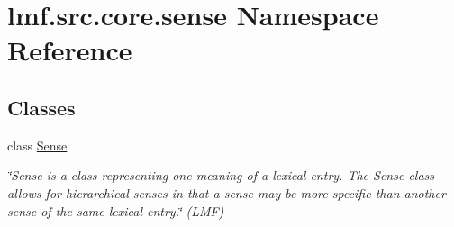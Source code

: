 \hypertarget{namespacelmf_1_1src_1_1core_1_1sense}{\section{lmf.\+src.\+core.\+sense Namespace Reference}
\label{namespacelmf_1_1src_1_1core_1_1sense}
}
\subsection*{Classes}
\begin{DoxyCompactItemize}
\item 
class \hyperlink{classlmf_1_1src_1_1core_1_1sense_1_1_sense}{Sense}
\begin{DoxyCompactList}\small\item\em \char`\"{}\+Sense is a class representing one meaning of a lexical entry. The Sense class allows for hierarchical senses in that a sense may be more specific than another sense of the same lexical entry.\char`\"{} (L\+M\+F) \end{DoxyCompactList}\end{DoxyCompactItemize}
